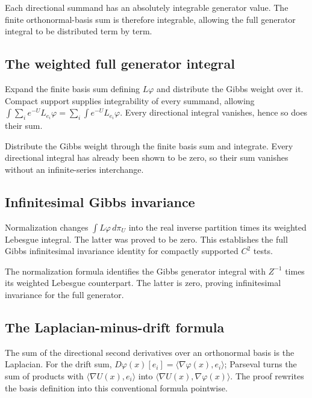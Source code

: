 \documentclass[11pt,a4paper]{article}
\begin{document}
Each directional summand has an absolutely integrable generator value. The finite orthonormal-basis sum is therefore integrable, allowing the full generator integral to be distributed term by term.


\subsection{\texorpdfstring{The weighted full generator integral}{The weighted full generator integral}}


Expand the finite basis sum defining \(L\varphi\) and distribute the Gibbs weight over it. Compact support supplies integrability of every summand, allowing \(\int\sum_i e^{-U}L_{e_i}\varphi=\sum_i\int e^{-U}L_{e_i}\varphi\). Every directional integral vanishes, hence so does their sum.



Distribute the Gibbs weight through the finite basis sum and integrate. Every directional integral has already been shown to be zero, so their sum vanishes without an infinite-series interchange.


\subsection{\texorpdfstring{Infinitesimal Gibbs invariance}{Infinitesimal Gibbs invariance}}


Normalization changes \(\int L\varphi\,d\pi_U\) into the real inverse partition times its weighted Lebesgue integral. The latter was proved to be zero. This establishes the full Gibbs infinitesimal invariance identity for compactly supported \(C^2\) tests.



The normalization formula identifies the Gibbs generator integral with \(Z^{-1}\) times its weighted Lebesgue counterpart. The latter is zero, proving infinitesimal invariance for the full generator.


\subsection{\texorpdfstring{The Laplacian-minus-drift formula}{The Laplacian-minus-drift formula}}


The sum of the directional second derivatives over an orthonormal basis is the Laplacian. For the drift sum, \(D\varphi(x)[e_i]=\langle\nabla\varphi(x),e_i\rangle\); Parseval turns the sum of products with \(\langle\nabla U(x),e_i\rangle\) into \(\langle\nabla U(x),\nabla\varphi(x)\rangle\). The proof rewrites the basis definition into this conventional formula pointwise.
\end{document}
